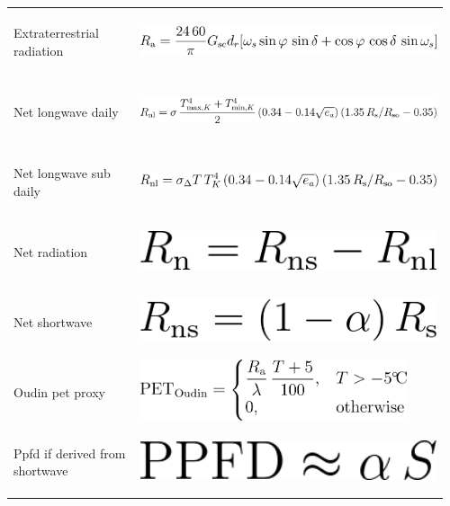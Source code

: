 \documentclass[11pt]{article}
\begin{document}
\begin{longtable}{@{}p{0.28\linewidth} p{0.68\linewidth}@{}}
Extraterrestrial radiation & \includegraphics[height=18mm]{figures/formulas/extraterrestrial_radiation.png} \\
Net longwave daily & \includegraphics[height=18mm]{figures/formulas/net_longwave_daily.png} \\
Net longwave sub daily & \includegraphics[height=18mm]{figures/formulas/net_longwave_sub_daily.png} \\
Net radiation & \includegraphics[height=18mm]{figures/formulas/net_radiation.png} \\
Net shortwave & \includegraphics[height=18mm]{figures/formulas/net_shortwave.png} \\
Oudin pet proxy & \includegraphics[height=18mm]{figures/formulas/oudin_pet_proxy.png} \\
Ppfd if derived from shortwave & \includegraphics[height=18mm]{figures/formulas/ppfd_if_derived_from_shortwave.png} \\

\end{longtable}
\end{document}
